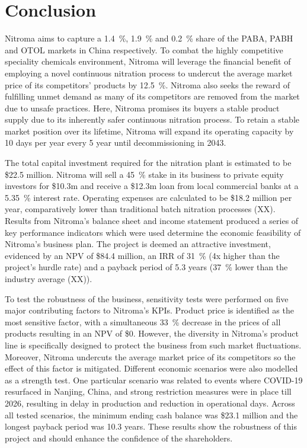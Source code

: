 \section{Conclusion}
Nitroma aims to capture a \SI{1.4}{\percent}, \SI{1.9}{\percent} and \SI{0.2}{\percent} share of the PABA, PABH and OTOL markets in China respectively. To combat the highly competitive speciality chemicals environment, Nitroma will leverage the financial benefit of employing a novel continuous nitration process to undercut the average market price of its competitors’ products by \SI{12.5}{\percent}. Nitroma also seeks the reward of fulfilling unmet demand as many of its competitors are removed from the market due to unsafe practices. Here, Nitroma promises its buyers a stable product supply due to its inherently safer continuous nitration process. To retain a stable market position over its lifetime, Nitroma will expand its operating capacity by 10 days per year every 5 year until decommissioning in 2043.

The total capital investment required for the nitration plant is estimated to be \$22.5 million. Nitroma will sell a \SI{45}{\percent} stake in its business to private equity investors for \$10.3m and receive a \$12.3m loan from local commercial banks at a \SI{5.35}{\percent} interest rate. Operating expenses are calculated to be \$18.2 million per year, comparatively lower than traditional batch nitration processes (XX).  Results from Nitroma’s balance sheet and income statement produced a series of key performance indicators which were used determine the economic feasibility of Nitroma’s business plan. The project is deemed an attractive investment, evidenced by an NPV of \$84.4 million, an IRR of \SI{31}{\percent} (4x higher than the project’s hurdle rate) and a payback period of 5.3 years (\SI{37}{\percent} lower than the industry average (XX)).

To test the robustness of the business, sensitivity tests were performed on five major contributing factors to Nitroma’s KPIs. Product price is identified as the most sensitive factor, with a simultaneous \SI{33}{\percent} decrease in the prices of all products resulting in an NPV of \$0. However, the diversity in Nitroma’s product line is specifically designed to protect the business from such market fluctuations. Moreover, Nitroma undercuts the average market price of its competitors so the effect of this factor is mitigated. Different economic scenarios were also modelled as a strength test. One particular scenario was related to events where COVID-19 resurfaced in Nanjing, China, and strong restriction measures were in place till 2026, resulting in delay in production and reduction in operational days. Across all tested scenarios, the minimum ending cash balance was \$23.1 million and the longest payback period was 10.3 years. These results show the robustness of this project and should enhance the confidence of the shareholders.